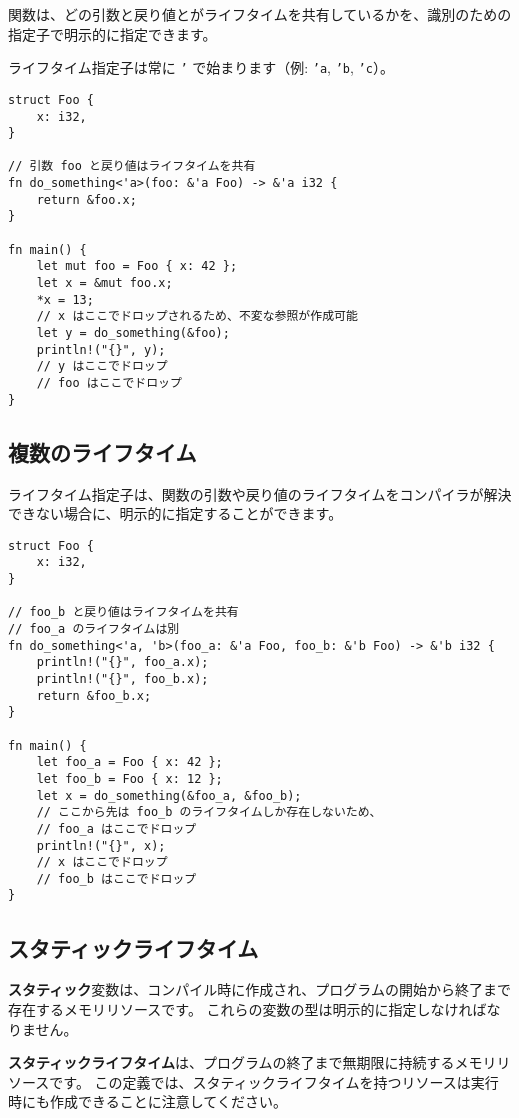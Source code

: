 関数は、どの引数と戻り値とがライフタイムを共有しているかを、識別のための指定子で明示的に指定できます。

ライフタイム指定子は常に \texttt{'} で始まります（例:
\texttt{'a}, \texttt{'b},
\texttt{'c}）。

\begin{verbatim}
struct Foo {
    x: i32,
}

// 引数 foo と戻り値はライフタイムを共有
fn do_something<'a>(foo: &'a Foo) -> &'a i32 {
    return &foo.x;
}

fn main() {
    let mut foo = Foo { x: 42 };
    let x = &mut foo.x;
    *x = 13;
    // x はここでドロップされるため、不変な参照が作成可能
    let y = do_something(&foo);
    println!("{}", y);
    // y はここでドロップ
    // foo はここでドロップ
}
\end{verbatim}

\subsection{複数のライフタイム}

ライフタイム指定子は、関数の引数や戻り値のライフタイムをコンパイラが解決できない場合に、明示的に指定することができます。

\begin{verbatim}
struct Foo {
    x: i32,
}

// foo_b と戻り値はライフタイムを共有
// foo_a のライフタイムは別
fn do_something<'a, 'b>(foo_a: &'a Foo, foo_b: &'b Foo) -> &'b i32 {
    println!("{}", foo_a.x);
    println!("{}", foo_b.x);
    return &foo_b.x;
}

fn main() {
    let foo_a = Foo { x: 42 };
    let foo_b = Foo { x: 12 };
    let x = do_something(&foo_a, &foo_b);
    // ここから先は foo_b のライフタイムしか存在しないため、
    // foo_a はここでドロップ
    println!("{}", x);
    // x はここでドロップ
    // foo_b はここでドロップ
}
\end{verbatim}

\subsection{スタティックライフタイム}

\textbf{スタティック}変数は、コンパイル時に作成され、プログラムの開始から終了まで存在するメモリリソースです。
これらの変数の型は明示的に指定しなければなりません。

\textbf{スタティックライフタイム}は、プログラムの終了まで無期限に持続するメモリリソースです。
この定義では、スタティックライフタイムを持つリソースは実行時にも作成できることに注意してください。

